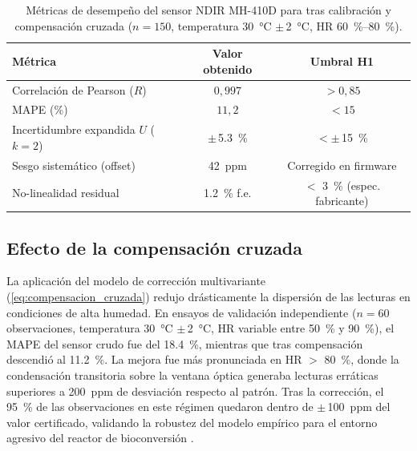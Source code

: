 \begin{table}[htbp]
\centering
\small
\caption{Métricas de desempeño del sensor NDIR MH-410D para  tras calibración y compensación cruzada ($n = 150$, temperatura \SI{30}{\celsius} $\pm$\,\SI{2}{\celsius}, HR \SI{60}{\percent}--\SI{80}{\percent}).}
\label{tab:metricas_ndir}
\begin{tabular}{lcc}
\toprule
\textbf{Métrica} & \textbf{Valor obtenido} & \textbf{Umbral H1} \\
\midrule
Correlación de Pearson ($R$) & $0{,}997$ & $> 0{,}85$ \\
MAPE (\si{\percent}) & $11{,}2$ & $< 15$ \\
Incertidumbre expandida $U$ ($k=2$) & $\pm$\,\SI{5.3}{\percent} & $< \pm$\,\SI{15}{\percent} \\
Sesgo sistemático (offset) & \SI{42}{ppm} & Corregido en firmware \\
No-linealidad residual & \SI{1.2}{\percent} f.e. & $<$ \SI{3}{\percent} (espec. fabricante) \\
\bottomrule
\end{tabular}
\end{table}

\subsection{Efecto de la compensación cruzada}
\label{subsec:cap2_resultados_compensacion}

La aplicación del modelo de corrección multivariante (\cref{eq:compensacion_cruzada}) redujo drásticamente la dispersión de las lecturas en condiciones de alta humedad. En ensayos de validación independiente ($n = 60$ observaciones, temperatura \SI{30}{\celsius} $\pm$\,\SI{2}{\celsius}, HR variable entre \SI{50}{\percent} y \SI{90}{\percent}), el MAPE del sensor crudo fue del \SI{18.4}{\percent}, mientras que tras compensación descendió al \SI{11.2}{\percent}. La mejora fue más pronunciada en HR $>$ \SI{80}{\percent}, donde la condensación transitoria sobre la ventana óptica generaba lecturas erráticas superiores a \SI{200}{ppm} de desviación respecto al patrón. Tras la corrección, el \SI{95}{\percent} de las observaciones en este régimen quedaron dentro de $\pm$\,\SI{100}{ppm} del valor certificado, validando la robustez del modelo empírico para el entorno agresivo del reactor de bioconversión \parencite{herrinCollateralDataQualitya, biagiDevelopmentMachineLearningbased2024a}.

